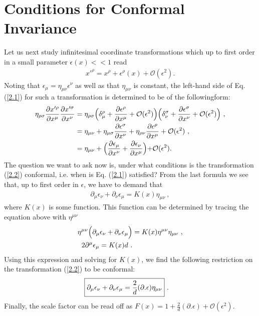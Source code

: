 \documentclass[12pt,a4paper]{report}
\begin{document}
\section{Conditions for Conformal Invariance}
Let us next study infinitesimal coordinate transformations \cite{Antonin, Ralph, Francesco} which up to first order in a small parameter $\epsilon(x)<<1$ read
\begin{align}
    x'^\rho=x^\rho+\epsilon^\rho(x)+\mathcal{O}(\epsilon^2).\label{2.2}
\end{align}
Noting that	$\epsilon_\mu=\eta_{\mu\nu}\epsilon^\nu$ as well as that $\eta_{\mu\nu}$ is constant, the left-hand side of Eq. (\eqref{2.1}) for such a transformation is determined to be of the followingform:
\begin{align}
  \eta_{\rho\sigma}\frac{\partial x'^{\rho}}{\partial x^{\mu}}\frac{\partial x'^{\sigma}}{\partial x^{\nu}}&=\eta_{\rho\sigma}\Bigl(\delta^\rho_\mu+\frac{\partial\epsilon^\rho}{\partial x^\mu}+\mathcal{O}(\epsilon^2)\Bigl)\Bigl(\delta^\sigma_\nu+\frac{\partial\epsilon^\sigma}{\partial x^\nu}+\mathcal{O}(\epsilon^2)\Bigl)\nonumber~,\\
  &=\eta_{\mu\nu}+\eta_{\mu\sigma}\frac{\partial\epsilon^\sigma}{\partial x^\nu}+\eta_{\rho\nu}\frac{\partial\epsilon^\rho}{\partial x^\mu}+\mathcal{O}(\epsilon^2)\nonumber~,\\
  &=\eta_{\mu\nu}+\Bigl(\frac{\partial\epsilon_\mu}{\partial x^\nu}+\frac{\partial\epsilon_\nu}{\partial x^\mu}\Bigl)+\mathcal{O}(\epsilon^2).\nonumber
\end{align}
The question we want to ask now is, under what conditions is the transformation (\eqref{2.2}) conformal, i.e. when is Eq. (\eqref{2.1}) satisfied? From the last formula we see that, up to first order in $\epsilon$, we have to demand
that
\begin{align}
    \partial_{\mu}\epsilon_{\nu}+\partial_{\nu}\epsilon_{\mu}=K(x)\eta_{\mu\nu}~,
\end{align}
where $K(x)$ is some function. This function can be determined by tracing the equation above with $\eta^{\mu\nu}$
\begin{align}
    \eta^{\mu\nu}\Bigl(\partial_{\mu}\epsilon_{\nu}+\partial_{\nu}\epsilon_{\mu}\Bigl)&=K(x)\eta^{\mu\nu}\eta_{\mu\nu}\nonumber~,\\
    2\partial^\mu\epsilon_\mu=K(x)d~.
\end{align}
Using this expression and solving for $K(x)$, we find the following restriction on the transformation (\eqref{2.2}) to be conformal:
\begin{align}
    \Aboxed{\partial_{\mu}\epsilon_{\nu}+\partial_{\nu}\epsilon_{\mu}=\frac{2}{d}(\partial.\epsilon)\eta_{\mu\nu}}~.\label{2.3}
\end{align}
Finally, the scale factor can be read
off as $F(x)=1+\frac{2}{d}(\partial.\epsilon)+\mathcal{O}(\epsilon^2)$.
\end{document}
